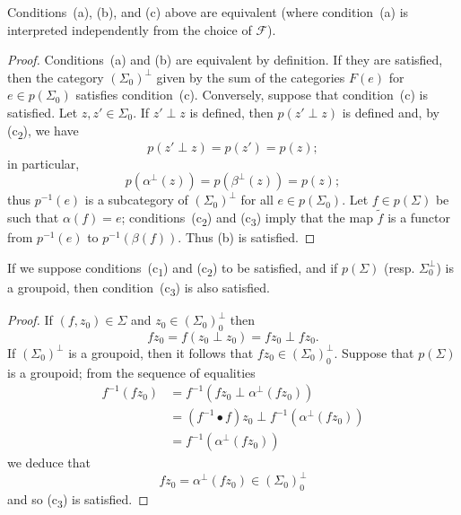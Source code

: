 \documentclass[a4paper,fleqn]{article}
\theoremstyle{plain}
\newenvironment{proposition}[1]
  {\renewcommand\theinnerproposition{#1}\innerproposition}
  {\endinnerproposition}
\newenvironment{corollary}[1]
  {\renewcommand\theinnercorollary{#1}\innercorollary}
  {\endinnercorollary}
\theoremstyle{definition}
\newcommand{\FF}{\mathcal{F}}
\newcommand{\smallbullet}{\bullet}
\begin{document}
\begin{proposition}{1}
\label{proposition:i-1}
  Conditions~(a), (b), and (c) above are equivalent (where condition~(a) is interpreted independently from the choice of $\FF$).
\end{proposition}

\begin{proof}
  Conditions~(a) and (b) are equivalent by definition.
  If they are satisfied, then the category $(\Sigma_0)^\perp$ given by the sum of the categories $F(e)$ for $e\in p(\Sigma_0)$ satisfies condition~(c).
  Conversely, suppose that condition~(c) is satisfied.
  Let $z,z'\in\Sigma_0$.
  If $z'\perp z$ is defined, then $p(z'\perp z)$ is defined and, by (c\textsubscript{2}), we have
  \[
    p(z'\perp z)
    = p(z')
    = p(z);
  \]
  in particular,
  \[
    p(\alpha^\perp(z))
    = p(\beta^\perp(z))
    = p(z);
  \]
  thus $p^{-1}(e)$ is a subcategory of $(\Sigma_0)^\perp$ for all $e\in p(\Sigma_0)$.
  Let $f\in p(\Sigma)$ be such that $\alpha(f)=e$;
  conditions~(c\textsubscript{2}) and (c\textsubscript{3}) imply that the map $\widetilde{f}$ is a functor from $p^{-1}(e)$ to $p^{-1}(\beta(f))$.
  Thus (b) is satisfied.
\end{proof}

\begin{corollary}{}
  If we suppose conditions~(c\textsubscript{1}) and (c\textsubscript{2}) to be satisfied, and if $p(\Sigma)$ (resp. $\Sigma_0^\perp$) is a groupoid, then condition~(c\textsubscript{3}) is also satisfied.
\end{corollary}

\begin{proof}
  If $(f,z_0)\in\Sigma$ and $z_0\in(\Sigma_0)_0^\perp$ then
  \[
    fz_0
    = f(z_0\perp z_0)
    =fz_0\perp fz_0.
  \]
  If $(\Sigma_0)^\perp$ is a groupoid, then it follows that $fz_0\in(\Sigma_0)_0^\perp$.
  Suppose that $p(\Sigma)$ is a groupoid;
  from the sequence of equalities
  \[
    \begin{aligned}
      f^{-1}(fz_0)
      &= f^{-1}(fz_0\perp\alpha^\perp(fz_0))
    \\&= (f^{-1}\smallbullet f)z_0\perp f^{-1}(\alpha^\perp(fz_0))
    \\&= f^{-1}(\alpha^\perp(fz_0))
    \end{aligned}
  \]
  we deduce that
  \[
    fz_0
    = \alpha^\perp(fz_0)
    \in(\Sigma_0)_0^\perp
  \]
  and so (c\textsubscript{3}) is satisfied.
\end{proof}
\end{document}
